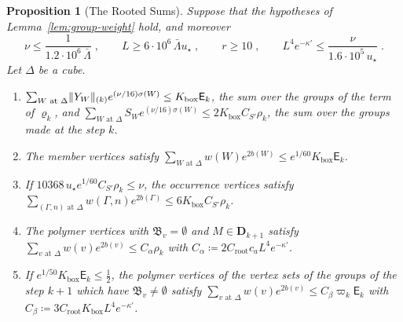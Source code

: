 \documentclass[11pt]{preprint}
\DeclarePairedDelimiter{\norm}{\lVert}{\rVert}
\numberwithin{equation}{section}
\newtheorem{proposition}[theorem]{Proposition}
\theoremstyle{definition}
\theoremstyle{remark}
\theoremstyle{plain}
\begin{document}
\begin{proposition}[The Rooted Sums]\label{prop:rooted-sums}
Suppose that the hypotheses of Lemma~\ref{lem:group-weight} hold, and moreover
\begin{equation}\label{eq:count-conditions}
    \nu \leq \frac{1}{1.2 \cdot 10^6\,\bar\Lambda}\;,
    \qquad
    L \geq 6 \cdot 10^6\,\bar\Lambda u_\star\;,
    \qquad
    r \geq 10\;,
    \qquad
    L^4e^{-\kappa'} \leq \frac{\nu}{1.6 \cdot 10^5\,u_\star}\;.
\end{equation}
Let $\Delta$ be a cube.
\begin{enumerate}[label=(\roman*)]
\item $\sum_{W \text{ at } \Delta}\norm{Y_W}_{(k)}e^{(\nu/16)\sigma(W)} \leq K_{\mathrm{box}}\mathsf E_k$, the sum over the groups of the term of $\varrho_k$, and $\sum_{W \text{ at } \Delta}S_We^{(\nu/16)\sigma(W)} \leq 2K_{\mathrm{box}}C_{S'}\rho_k$, the sum over the groups made at the step $k$.
\item The member vertices satisfy $\sum_{W \text{ at } \Delta}w(W)e^{2b(W)} \leq e^{1/60}K_{\mathrm{box}}\mathsf E_k$.
\item If $10368\,u_\star e^{1/60}C_{S'}\rho_k \leq \nu$, the occurrence vertices satisfy $\sum_{(\Gamma, n) \text{ at } \Delta}w(\Gamma, n)e^{2b(\Gamma)} \leq 6K_{\mathrm{box}}C_{S'}\rho_k$.
\item The polymer vertices with $\mathfrak B_v = \emptyset$ and $M \in \mathbf D_{k+1}$ satisfy $\sum_{v \text{ at } \Delta}w(v)e^{2b(v)} \leq C_\alpha\rho_k$ with $C_\alpha \coloneqq 2C_{\mathrm{root}}c_aL^4e^{-\kappa'}$.
\item If $e^{1/50}K_{\mathrm{box}}\mathsf E_k \leq \frac12$, the polymer vertices of the vertex sets of the groups of the step $k + 1$ which have $\mathfrak B_v \neq \emptyset$ satisfy $\sum_{v \text{ at } \Delta}w(v)e^{2b(v)} \leq C_\beta\varpi_k\mathsf E_k$ with $C_\beta \coloneqq 3C_{\mathrm{root}}K_{\mathrm{box}}L^4e^{-\kappa'}$.
\end{enumerate}
\end{proposition}
\end{document}
